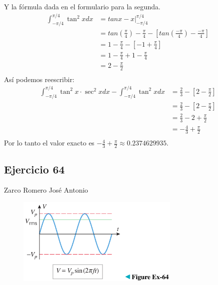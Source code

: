 \documentclass[12pt]{article}
\begin{document}
  Y la fórmula dada en el formulario para la segunda.
    \begin{align*}
      \int_{-\pi/4}^{\pi/4}   \tan^2{x}  dx
      & = tanx - x  \Bigg|_{-\pi/4}^{\pi/4}\\
      & = tan\left(\frac{\pi}{4}\right) - \frac{\pi}{4} - \left[ tan\left(\frac{-\pi}{4}\right) - \frac{-\pi}{4} \right] \\
      & = 1 - \frac{\pi}{4} - \left[ -1 + \frac{\pi}{4} \right] \\
      & = 1 - \frac{\pi}{4} + 1 - \frac{\pi}{4} \\
      & = 2 - \frac{\pi}{2}  \\
    \end{align*}
    Así podemos reescribir:
      \begin{align*}
        \int_{-\pi/4}^{\pi/4} \tan^2{x} \cdot \sec^2{x} dx - \int_{-\pi/4}^{\pi/4}   \tan^2{x}  dx 
       & = \frac{2}{3} - \left[ 2 - \frac{\pi}{2} \right]\\
       & = \frac{2}{3} - \left[ 2 - \frac{\pi}{2} \right]\\
       & = \frac{2}{3} - 2 + \frac{\pi}{2} \\
       & = -\frac{4}{3}  + \frac{\pi}{2} \\
      \end{align*}
Por lo tanto el valor exacto es $-\frac{4}{3} + \frac{\pi}{2} \approx 0.2374629935 $.
\subsection{Ejercicio 64} Zarco Romero José Antonio \\

\begin{figure}[H]
\centering
\includegraphics[width=0.7\textwidth]{../img/img_Lista4/1_64.png}
\end{figure}
\end{document}
